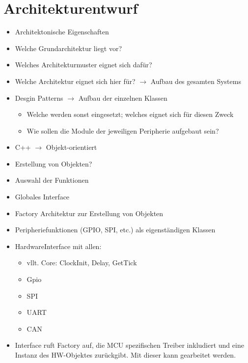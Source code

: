 \section{Architekturentwurf}

\begin{itemize}
	\item Architektonische Eigenschaften
	\item Welche Grundarchitektur liegt vor?
	\item Welches Architekturmuster eignet sich dafür?
	\item Welche Architektur eignet sich hier für? $\rightarrow$ Aufbau des gesamten Systems
	\item Desgin Patterns $\rightarrow$ Aufbau der einzelnen Klassen
	\begin{itemize}
		\item Welche werden sonst eingesetzt; welches eignet sich für diesen Zweck
		\item Wie sollen die Module der jeweiligen Peripherie aufgebaut sein?
	\end{itemize}
	\item C++ $\rightarrow$ Objekt-orientiert
	\item Erstellung von Objekten?
	\item Auswahl der Funktionen
	\item Globales Interface
	\item Factory Architektur zur Erstellung von Objekten
	\item Peripheriefunktionen (GPIO, SPI, etc.) als eigenständigen Klassen
	\item HardwareInterface mit allen:
	\begin{itemize}
		\item vllt. Core: ClockInit, Delay, GetTick
		\item Gpio
		\item SPI
		\item UART
		\item CAN
	\end{itemize}
	\item Interface ruft Factory auf, die MCU spezifischen Treiber inkludiert und eine Instanz des HW-Objektes zurückgibt. Mit dieser kann gearbeitet werden.
\end{itemize}



